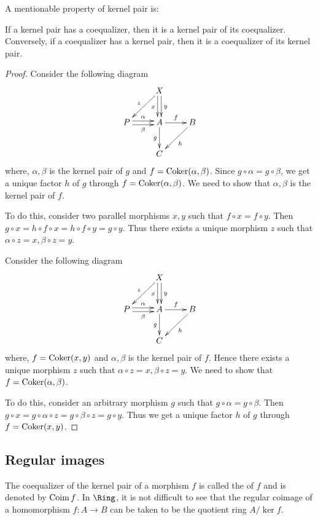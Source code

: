   A mentionable property of kernel pair is:
  \begin{prop}\label{prop:kernel pair}
    If a kernel pair has a coequalizer, then it is a kernel pair of its coequalizer. Conversely, if a coequalizer has a kernel pair, then it is a coequalizer of its kernel pair.
  \end{prop}
  \begin{proof}
    Consider the following diagram
    \begin{displaymath}
      \xymatrix{
         &X\ar@<-0.5ex>[d]_{x}\ar@<0.5ex>[d]^{y}\ar[dl]_{z}&\\
         P\ar@<0.5ex>[r]^{\alpha}\ar@<-0.5ex>[r]_{\beta}&A\ar[r]^{f}\ar[d]_{g}&B\ar[dl]^{h}\\
         &C&
      }
    \end{displaymath}
    where, $\alpha,\beta$ is the kernel pair of $g$ and $f=\operatorname{Coker}(\alpha,\beta)$. Since $g\circ\alpha=g\circ\beta$, we get a unique factor $h$ of $g$ through $f=\operatorname{Coker}(\alpha,\beta)$.
    We need to show that $\alpha,\beta$ is the kernel pair of $f$.

    To do this, consider two parallel morphisms $x,y$ such that $f\circ x=f\circ y$. Then $g\circ x=h\circ f\circ x=h\circ f\circ y=g\circ y$. Thus there exists a unique morphism $z$ such that $\alpha\circ z=x, \beta\circ z=y$.

    Consider the following diagram
    \begin{displaymath}
      \xymatrix{
         &X\ar@<-0.5ex>[d]_{x}\ar@<0.5ex>[d]^{y}\ar[dl]_{z}&\\
         P\ar@<0.5ex>[r]^{\alpha}\ar@<-0.5ex>[r]_{\beta}&A\ar[r]^{f}\ar[d]_{g}&B\ar[dl]^{h}\\
         &C&
      }
    \end{displaymath}
    where, $f=\operatorname{Coker}(x,y)$ and $\alpha,\beta$ is the kernel pair of $f$. Hence there exists a unique morphism $z$ such that $\alpha\circ z=x, \beta\circ z=y$.
    We need to show that $f=\operatorname{Coker}(\alpha,\beta)$.

    To do this, consider an arbitrary morphism $g$ such that $g\circ\alpha=g\circ\beta$. Then $g\circ x=g\circ\alpha\circ z=g\circ\beta\circ z=g\circ y$. Thus we get a unique factor $h$ of $g$ through $f=\operatorname{Coker}(x,y)$.
  \end{proof}

\subsection{Regular images}
  The coequalizer of the kernel pair of a morphism $f$ is called the  of $f$ and is denoted by $\operatorname{Coim}{f}$. In $\Ring$, it is not difficult to see that the regular coimage of a homomorphism $f\colon A\to B$ can be taken to be the quotient ring $A/\ker{f}$.

